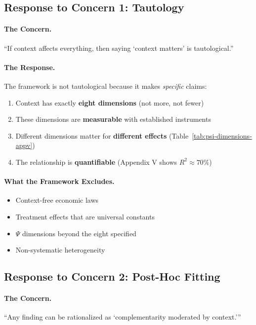 \subsection{Response to Concern 1: Tautology}

\paragraph{The Concern.}
``If context affects everything, then saying `context matters' is tautological.''

\paragraph{The Response.}
The framework is not tautological because it makes \textit{specific} claims:
\begin{enumerate}
    \item Context has exactly \textbf{eight dimensions} (not more, not fewer)
    \item These dimensions are \textbf{measurable} with established instruments
    \item Different dimensions matter for \textbf{different effects} (Table~\ref{tab:psi-dimensions-appv})
    \item The relationship is \textbf{quantifiable} (Appendix V shows $R^2 \approx 70\%$)
\end{enumerate}

\paragraph{What the Framework Excludes.}
\begin{itemize}
    \item Context-free economic laws
    \item Treatment effects that are universal constants
    \item $\Psi$ dimensions beyond the eight specified
    \item Non-systematic heterogeneity
\end{itemize}

\subsection{Response to Concern 2: Post-Hoc Fitting}

\paragraph{The Concern.}
``Any finding can be rationalized as `complementarity moderated by context.'''


